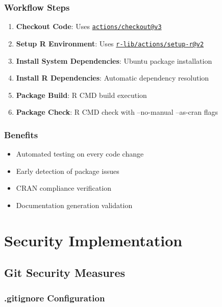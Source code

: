 \documentclass[
  11pt,
]{article}
\providecommand{\tightlist}{%
  \setlength{\itemsep}{0pt}\setlength{\parskip}{0pt}}
\begin{document}
\subsubsection{Workflow Steps}\label{workflow-steps}

\begin{enumerate}
\def\labelenumi{\arabic{enumi}.}
\tightlist
\item
  \textbf{Checkout Code}: Uses
  \href{mailto:actions/checkout@v3}{\nolinkurl{actions/checkout@v3}}
\item
  \textbf{Setup R Environment}: Uses
  \href{mailto:r-lib/actions/setup-r@v2}{\nolinkurl{r-lib/actions/setup-r@v2}}
\item
  \textbf{Install System Dependencies}: Ubuntu package installation
\item
  \textbf{Install R Dependencies}: Automatic dependency resolution
\item
  \textbf{Package Build}: R CMD build execution
\item
  \textbf{Package Check}: R CMD check with --no-manual --as-cran flags
\end{enumerate}

\subsubsection{Benefits}\label{benefits}

\begin{itemize}
\tightlist
\item
  Automated testing on every code change
\item
  Early detection of package issues
\item
  CRAN compliance verification
\item
  Documentation generation validation
\end{itemize}

\newpage

\section{Security Implementation}\label{security-implementation}

\subsection{Git Security Measures}\label{git-security-measures}

\subsubsection{.gitignore Configuration}\label{gitignore-configuration}
\end{document}
